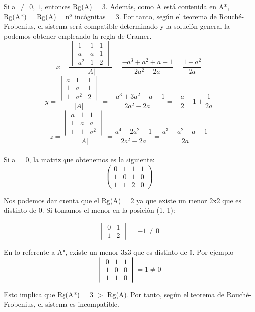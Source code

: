 \documentclass{article}
\begin{document}
Si a $\neq$ $0$, $1$, entonces Rg(A) = 3. Adem\'as, como A est\'a contenida en A*, Rg(A*) = Rg(A) = n$^{\text{o}}$ inc\'ognitas = 3. Por tanto, seg\'un el teorema de Rouch\'e-Frobenius, el sistema ser\'a compatible determinado y la soluci\'on general la podemos obtener empleando la regla de Cramer.
$$
x=\frac{\begin{vmatrix}1 & 1 & 1 \\a & a & 1\\a^{2} & 1 & 2\end{vmatrix}}{|A|}=\frac{- a^{3} + a^{2} + a - 1}{2 a^{2} - 2 a}=\frac{1 - a^{2}}{2 a}$$$$
y=\frac{\begin{vmatrix}a & 1 & 1 \\1 & a & 1\\1 & a^{2} & 2\end{vmatrix}}{|A|}=\frac{- a^{3} + 3 a^{2} - a - 1}{2 a^{2} - 2 a}=- \frac{a}{2} + 1 + \frac{1}{2 a}$$$$
z=\frac{\begin{vmatrix}a & 1 & 1 \\1 & a & a\\1 & 1 & a^{2}\end{vmatrix}}{|A|}=\frac{a^{4} - 2 a^{2} + 1}{2 a^{2} - 2 a}=\frac{a^{3} + a^{2} - a - 1}{2 a}$$\\

Si a = $0$, la matriz que obtenemos es la siguiente:
$$
\left(\begin{array}{ccc|c}0 & 1 & 1 & 1 \\1 & 0 & 1 & 0\\1 & 1 & 2 & 0\end{array}\right)$$

Nos podemos dar cuenta que el Rg(A) = 2 ya que existe un menor 2x2 que es distinto de 0. Si tomamos el menor en la posici\'on (1, 1):

$$
\begin{vmatrix}0 & 1\\1 & 2\end{vmatrix} = -1 \neq 0$$

En lo referente a A*, existe un menor 3x3 que es distinto de 0. Por ejemplo $$
\begin{vmatrix}0 & 1 & 1 \\1 & 0 & 0\\1 & 1 & 0\end{vmatrix} = 1 \neq 0$$

Esto implica que Rg(A*) = 3 $>$ Rg(A). Por tanto, seg\'un el teorema de Rouch\'e-Frobenius, el sistema es incompatible.\\
\end{document}
